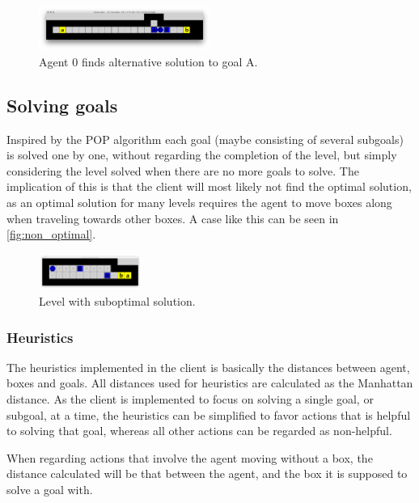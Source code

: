 \documentclass[Main]{subfiles}
\begin{document}
\begin{figure}[h!]
  \centering
  \includegraphics[width=0.5\textwidth]{backtrack2.png}
  \caption{Agent 0 finds alternative solution to goal A.}
  \label{fig:backtrack2}
\end{figure}

\subsection{Solving goals}
Inspired by the POP algorithm each goal (maybe consisting of several subgoals)
is solved one by one, without regarding the completion of the level, but simply
considering the level solved when there are no more goals to solve.
The implication of this is that the client will most likely not find the
optimal solution, as an optimal solution for many levels requires the agent to
move boxes along when traveling towards other boxes.
A case like this can be seen in \autoref{fig:non_optimal}.

\begin{figure}[h!]
  \centering
  \includegraphics[width=0.3\textwidth]{non_optimal.png}
  \caption{Level with suboptimal solution.}
  \label{fig:non_optimal}
\end{figure}

\subsubsection{Heuristics}
\label{sec:method_heuristics}
The heuristics implemented in the client is basically the distances between
agent, boxes and goals.
All distances used for heuristics are calculated as the Manhattan distance.
As the client is implemented to focus on solving a single goal, or subgoal, at a
time, the heuristics can be simplified to favor actions that is helpful to
solving that goal, whereas all other actions can be regarded as non-helpful.
 
When regarding actions that involve the agent moving without a box, the distance
calculated will be that between the agent, and the box it is supposed to solve a
goal with.
\end{document}
